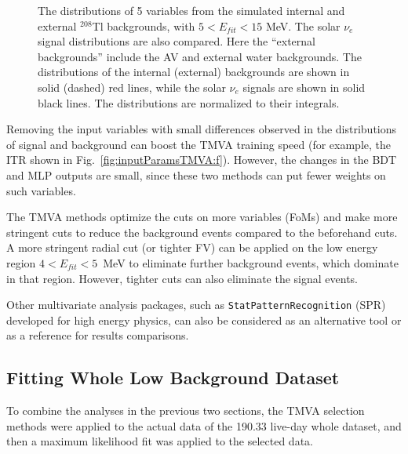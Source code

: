 \begin{figure}[htbp]
{\begin{minipage}[b]{0.4\textwidth}
	\end{minipage}
   }
	\caption[The distributions of 5 variables from the simulated internal and external $^{208}$Tl backgrounds.]{The distributions of 5 variables from the simulated internal and external $^{208}$Tl backgrounds, with $5<E_{fit}<15$ MeV. The solar $\nu_e$ signal distributions are also compared. Here the ``external backgrounds'' include the AV and external water backgrounds. The distributions of the internal (external) backgrounds are shown in solid (dashed) red lines, while the solar $\nu_e$ signals are shown in solid black lines. The distributions are normalized to their integrals.\label{fig:cmpExternalInternal}}
\end{figure}

Removing the input variables with small differences observed in the distributions of signal and background can boost the TMVA training speed (for example, the ITR shown in Fig.~\ref{fig:inputParamsTMVA:f}). However, the changes in the BDT and MLP outputs are small, since these two methods can put fewer weights on such variables.

The TMVA methods optimize the cuts on more variables (FoMs) and make more stringent cuts to reduce the background events compared to the beforehand cuts. A more stringent radial cut (or tighter FV) can be applied on the low energy region $4<E_{fit}<5$~MeV to eliminate further background events, which dominate in that region. However, tighter cuts can also eliminate the signal events.

Other multivariate analysis packages, such as \texttt{StatPatternRecognition} (SPR) \cite{sprWebsite} developed for high energy physics, can also be considered as an alternative tool or as a reference for results comparisons. 

\subsection{Fitting Whole Low Background Dataset}\label{sect:fitTheWhole}
To combine the analyses in the previous two sections, the TMVA selection methods were applied to the actual data of the 190.33 live-day whole dataset, and then a maximum likelihood fit was applied to the selected data. 

